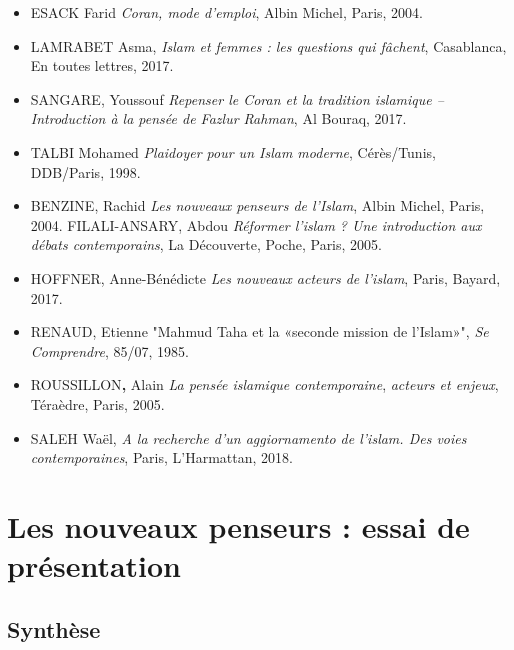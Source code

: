 \begin{itemize}
\item
  
  ESACK Farid \emph{Coran, mode d'emploi}, Albin Michel, Paris, 2004.
  
\item
  
  LAMRABET Asma, \emph{Islam et femmes : les questions qui fâchent},
  Casablanca, En toutes lettres, 2017.
  
\item
  
  SANGARE, Youssouf \emph{Repenser le Coran et la tradition islamique --
  Introduction à la pensée de Fazlur Rahman}, Al Bouraq, 2017.
  
\item

  TALBI Mohamed \emph{Plaidoyer pour un Islam moderne}, Cérès/Tunis,
  DDB/Paris, 1998.
  

\item BENZINE, Rachid \emph{Les nouveaux penseurs de l'Islam}, Albin Michel,
Paris, 2004. FILALI-ANSARY, Abdou \emph{Réformer l'islam ? Une
introduction aux débats contemporains}, La
Découverte, Poche, Paris, 2005.

 \item HOFFNER, Anne-Bénédicte \emph{Les nouveaux acteurs de l'islam}, Paris,
Bayard, 2017.

\item RENAUD, Etienne "Mahmud Taha et la «seconde mission de l'Islam»",
\emph{Se Comprendre}, 85/07, 1985.

\item ROUSSILLON\textbf{,} Alain \emph{La pensée islamique contemporaine},
\emph{acteurs et enjeux}, Téraèdre, Paris, 2005.

\item SALEH Waël, \emph{A la recherche d'un aggiornamento de l'islam. Des
voies contemporaines}, Paris, L'Harmattan, 2018.

\end{itemize}



\section{Les nouveaux penseurs : essai
  de
  présentation}
  
  \subsection{Synthèse}
  
